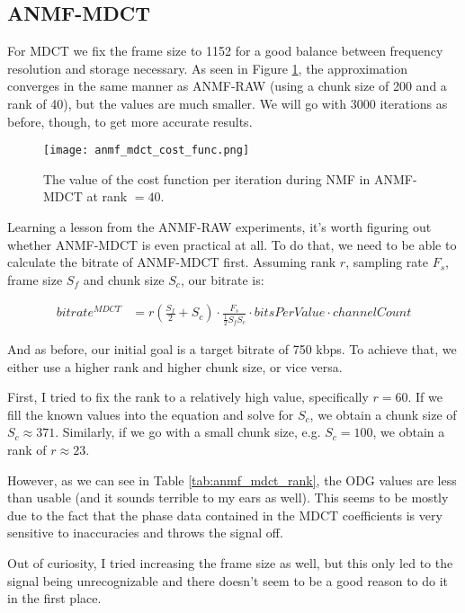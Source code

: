 \subsection{ANMF-MDCT}
For MDCT we fix the frame size to 1152 for a good balance between frequency resolution and storage necessary. As seen in Figure \ref{fig:anmf_mdct_cost_func}, the approximation converges in the same manner as ANMF-RAW (using a chunk size of 200 and a rank of 40), but the values are much smaller. We will go with 3000 iterations as before, though, to get more accurate results.

\begin{figure}[ht]
	\caption[ANMF-MDCT cost function]{The value of the cost function per iteration during NMF in ANMF-MDCT at rank $= 40$.}
	\label{fig:anmf_mdct_cost_func}
	\centering
	\texttt{[image: anmf\_mdct\_cost\_func.png]}
\end{figure}

Learning a lesson from the ANMF-RAW experiments, it's worth figuring out whether ANMF-MDCT is even practical at all. To do that, we need to be able to calculate the bitrate of ANMF-MDCT first. Assuming rank $r$, sampling rate $F_s$, frame size $S_f$ and chunk size $S_c$, our bitrate is:

\begin{align}
bitrate^{MDCT} &= r(\frac{S_f}{2} + S_c) \cdot \frac{F_s}{\frac12 S_fS_c} \cdot bitsPerValue \cdot channelCount
\end{align}

And as before, our initial goal is a target bitrate of 750 kbps. To achieve that, we either use a higher rank and higher chunk size, or vice versa.

First, I tried to fix the rank to a relatively high value, specifically $r = 60$. If we fill the known values into the equation and solve for $S_c$, we obtain a chunk size of $S_c \approx 371$. Similarly, if we go with a small chunk size, e.g. $S_c = 100$, we obtain a rank of $r \approx 23$.

However, as we can see in Table \ref{tab:anmf_mdct_rank}, the ODG values are less than usable (and it sounds terrible to my ears as well). This seems to be mostly due to the fact that the phase data contained in the MDCT coefficients is very sensitive to inaccuracies and throws the signal off.

Out of curiosity, I tried increasing the frame size as well, but this only led to the signal being unrecognizable and there doesn't seem to be a good reason to do it in the first place.

